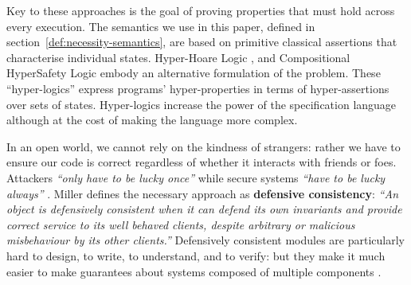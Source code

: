 Key to these approaches is the goal of proving properties that must
hold across every execution. The semantics we use in this paper,
defined in section~\ref{def:necessity-semantics}, are based on
primitive classical assertions that characterise individual states.
%
Hyper-Hoare Logic \cite{hyper-hoare-pldi2024}, and Compositional
HyperSafety Logic \cite{compositional-hypersafety-oopsla2022} embody
an alternative formulation of the problem. These ``hyper-logics''
express 
programs' hyper-properties in terms of hyper-assertions
over sets of states.
Hyper-logics increase the power of the specification language although
at the cost of making the language more complex.

















In an open world, we cannot rely on the kindness of strangers: rather
we have to ensure our code is correct regardless of whether it
interacts with friends or foes.
Attackers 
\textit{``only have to be lucky once''} while secure systems 
\textit{``have to be lucky always''} \cite{IRAThatcher}.
Miller \cite{miller-esop2013,MillerPhD} defines the necessary approach
as \textbf{defensive consistency}: \textit{``An object is defensively
  consistent when it can defend its own invariants and provide correct
  service to its well behaved clients, despite arbitrary or malicious
  misbehaviour by its other clients.''}  Defensively consistent
modules are particularly hard to design, to write, to understand, and
to verify: but
they make it much
easier to make guarantees about systems composed of multiple components
\cite{Murray10dphil}.







